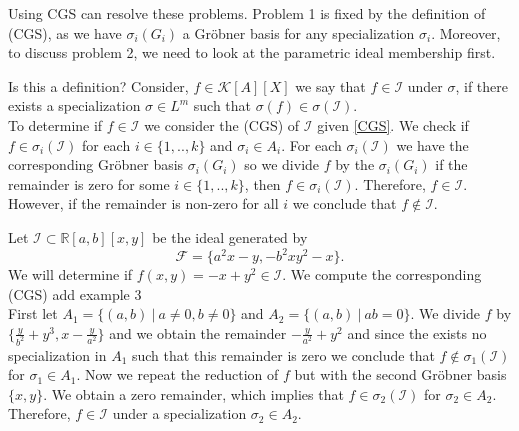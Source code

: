 \documentclass[runningheads]{llncs}
\newcommand{\Rr}{\mathbb{R}}
\newcommand{\1}{\chi}
\newcommand{\Ff}{\mathcal{F}}
\newcommand{\Ii}{\mathcal{I}}
\newcommand{\Kk}{\mathcal{K}}
\begin{document}
Using CGS can resolve these problems. Problem 1 is fixed by the definition of (CGS), as we have $\sigma_i(G_i)$ a 
 Gr{\"o}bner basis for any specialization $\sigma_i$. Moreover, 
 to discuss problem 2, we need to look at the parametric ideal membership first.

{\color{red} Is this a definition?}
 Consider, $f\in \Kk[A][X]$ we say that $f\in\Ii$ under $\sigma$, if there exists a specialization 
 $\sigma\in L^m$ such that $\sigma(f)\in\sigma(\Ii)$.\\

To determine if $f\in\Ii$ we consider the (CGS) of $\Ii$ given \ref{CGS}. 
We check if $f\in\sigma_i(\Ii)$ for each $i\in\{1,..,k\}$ and $\sigma_i\in A_i$.
For each $\sigma_i(\Ii)$ we have the corresponding Gr{\"o}bner basis $\sigma_i(G_i)$
so we divide $f$ by the $\sigma_i(G_i)$ if the remainder is zero for some $i\in\{1,..,k\}$,
then $f\in\sigma_i(\Ii)$. Therefore, $f\in\Ii$. However, if the remainder is non-zero for all $i$ we conclude that 
$f\notin\Ii$.

\begin{example}
	Let $\mathcal{I}\subset \Rr[a,b][x,y]$ be the ideal generated by 
    $$\Ff=\{a^2 x - y, -b^2 x y^2 - x\}.$$
	We will determine if $f(x,y)=-x+y^2\in\mathcal{I}$.
	We compute the corresponding (CGS)
	{\color{red} add example 3}\\
	First let $A_1=\{(a,b)~|~ a\ne 0, b\ne 0\}$ and $A_2=\{(a,b)~|~ ab=0\}$. 
	We divide $f$ by $\{\frac{y}{b^2}+y^3,x-\frac{y}{a^2}\}$ and we obtain the remainder $-\frac{y}{a^2}+y^2$ and 
	since the exists no specialization in $A_1$ such that this remainder is zero we conclude that $f\notin \sigma_1(\Ii)$ for
	$\sigma_1\in A_1$. Now we repeat the reduction of $f$ but with the second Gr{\"o}bner basis $\{x,y\}$. We obtain a zero remainder, which implies that 
	$f\in \sigma_2(\Ii)$ for $\sigma_2\in A_2$. Therefore, $f\in\Ii$ under a specialization $\sigma_2\in A_2$.
\end{example}







\newpage
\end{document}
